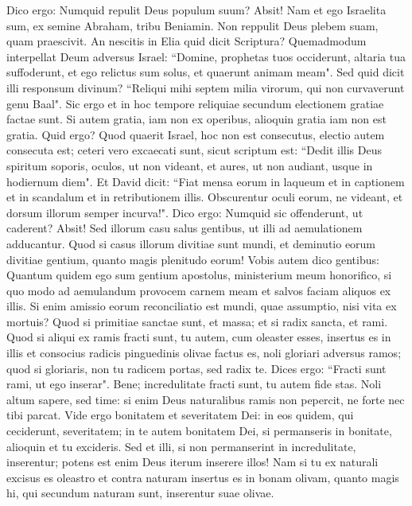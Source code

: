 \begin{biblechapter}  
\verse Dico ergo: Numquid repulit Deus populum suum? Absit! Nam et ego Israelita sum, ex semine Abraham, tribu Beniamin. 
\verse Non reppulit Deus plebem suam, quam praescivit. An nescitis in Elia quid dicit Scriptura? Quemadmodum interpellat Deum adversus Israel: 
\verse “Domine, prophetas tuos occiderunt, altaria tua suffoderunt, et ego relictus sum solus, et quaerunt animam meam". 
\verse Sed quid dicit illi responsum divinum? “Reliqui mihi septem milia virorum, qui non curvaverunt genu Baal". 
\verse Sic ergo et in hoc tempore reliquiae secundum electionem gratiae factae sunt. 
\verse Si autem gratia, iam non ex operibus, alioquin gratia iam non est gratia. 
\verse Quid ergo? Quod quaerit Israel, hoc non est consecutus, electio autem consecuta est; ceteri vero excaecati sunt, 
\verse sicut scriptum est: “Dedit illis Deus spiritum soporis, oculos, ut non videant, et aures, ut non audiant, usque in hodiernum diem". 
\verse Et David dicit: “Fiat mensa eorum in laqueum et in captionem et in scandalum et in retributionem illis. 
\verse Obscurentur oculi eorum, ne videant, et dorsum illorum semper incurva!". 
\verse Dico ergo: Numquid sic offenderunt, ut caderent? Absit! Sed illorum casu salus gentibus, ut illi ad aemulationem adducantur. 
\verse Quod si casus illorum divitiae sunt mundi, et deminutio eorum divitiae gentium, quanto magis plenitudo eorum! 
\verse Vobis autem dico gentibus: Quantum quidem ego sum gentium apostolus, ministerium meum honorifico, 
\verse si quo modo ad aemulandum provocem carnem meam et salvos faciam aliquos ex illis. 
\verse Si enim amissio eorum reconciliatio est mundi, quae assumptio, nisi vita ex mortuis? 
\verse Quod si primitiae sanctae sunt, et massa; et si radix sancta, et rami. 
\verse Quod si aliqui ex ramis fracti sunt, tu autem, cum oleaster esses, insertus es in illis et consocius radicis pinguedinis olivae factus es, 
\verse noli gloriari adversus ramos; quod si gloriaris, non tu radicem portas, sed radix te. 
\verse Dices ergo: “Fracti sunt rami, ut ego inserar". 
\verse Bene; incredulitate fracti sunt, tu autem fide stas. Noli altum sapere, sed time: 
\verse si enim Deus naturalibus ramis non pepercit, ne forte nec tibi parcat. 
\verse Vide ergo bonitatem et severitatem Dei: in eos quidem, qui ceciderunt, severitatem; in te autem bonitatem Dei, si permanseris in bonitate, alioquin et tu excideris. 
\verse Sed et illi, si non permanserint in incredulitate, inserentur; potens est enim Deus iterum inserere illos! 
\verse Nam si tu ex naturali excisus es oleastro et contra naturam insertus es in bonam olivam, quanto magis hi, qui secundum naturam sunt, inserentur suae olivae. 

\end{biblechapter}
